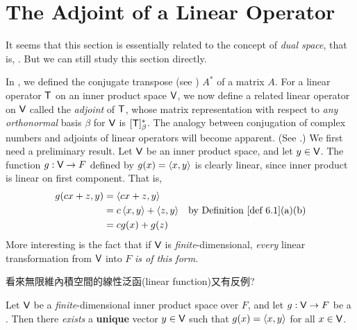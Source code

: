\section{The Adjoint of a Linear Operator} \label{sec 6.3}

\begin{remark} \label{remark 6.3.1}
It seems that this section is essentially related to the concept of \emph{dual space}, that is, .
But we can still study this section directly.
\end{remark}

In , we defined the conjugate transpose (see ) \(A^*\) of a matrix \(A\).
For a linear operator \(\textsf{T}\) on an inner product space \(\textsf{V}\), we now define a related linear operator on \(\textsf{V}\) called the \emph{adjoint} of \(\textsf{T}\), whose matrix representation with respect to \emph{any orthonormal} basis \(\beta\) for \(\textsf{V}\) is \([\textsf{T}]^*_{\beta}\).
The analogy between conjugation of complex numbers and adjoints of linear operators will become apparent. (See .)
We first need a preliminary result.
Let \(\textsf{V}\) be an inner product space, and let \(y \in \textsf{V}\).
The function \(g: \textsf{V} \to F\) defined by \(g(x) = \left< x, y \right>\) is clearly linear, since inner product is linear on first component.
That is,
\begin{align*}
    g(cx + z, y) & = \LG cx + z, y \RG \\
        & = c \LG x, y \RG + \LG z, y \RG & \text{by \DEF{6.1}(a)(b)} \\
        & = c g(x) + g(z)
\end{align*}
More interesting is the fact that if \(\textsf{V}\) is \emph{finite}-dimensional, \emph{every} linear transformation from \(\textsf{V}\) into \(F\) \emph{is of this form}.

\begin{note}
看來無限維內積空間的線性泛函(linear function)又有反例?
\end{note}

\begin{theorem} \label{thm 6.8}
Let \(\textsf{V}\) be a \emph{finite}-dimensional inner product space over \(F\), and let \(g: \textsf{V} \to F\) be a \LTRAN{}.
Then there \emph{exists} a \textbf{unique} vector \(y \in \textsf{V}\) such that \(g(x) = \left< x, y \right>\) for all \(x \in \textsf{V}\).
\end{theorem}


